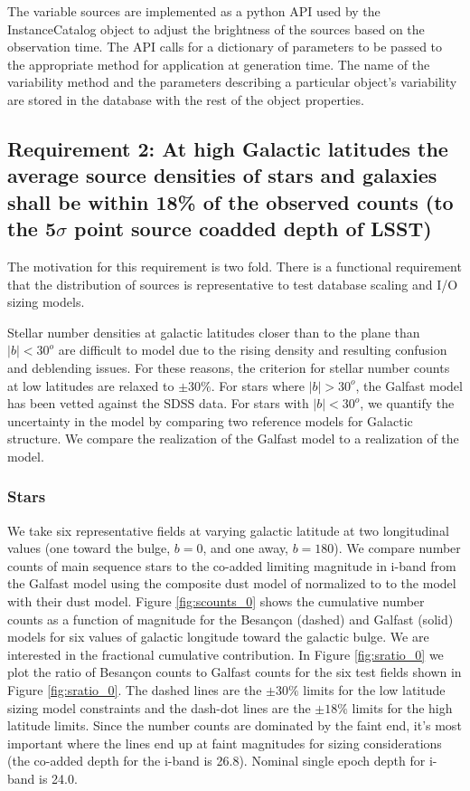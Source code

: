 \documentclass[]{article}
\begin{document}
{The variable sources are implemented as a python API used by the InstanceCatalog object to adjust the brightness of the sources based on the observation time.
The API calls for a dictionary of parameters to be passed to the appropriate method for application at generation time.  The name of the variability method and
the parameters describing a particular object's variability are stored in the database with the rest of the object properties.

\subsection{Requirement 2: At high Galactic latitudes the average source densities of stars and galaxies
shall be within 18\% of the observed counts (to the 5$\sigma$ point source coadded depth of LSST)}
The motivation for this requirement is two fold.  There is a functional requirement that the distribution of sources is representative
to test database scaling and I/O sizing models.  

Stellar number densities at galactic latitudes closer than to the plane than $|b| < 30^o$ are difficult to model due to the rising density and resulting confusion and deblending issues.
For these reasons, the criterion for stellar number counts at low latitudes are relaxed to $\pm 30\%$. 
For stars where $|b| > 30^o$, the Galfast model has been vetted against the SDSS data.  For stars with $|b| < 30^o$, we quantify the uncertainty in the model by comparing two reference models for Galactic structure.
We compare the realization of the Galfast model to a realization of the \citet{besancon} model.

\subsubsection{Stars}
We take six representative fields at varying galactic latitude at two longitudinal values (one toward the bulge, $b=0$, and one away, $b=180$).  
We compare number 
counts of main sequence stars to the co-added limiting magnitude in i-band 
 from the Galfast model using the composite dust model
of \citet{amores05} normalized to \citet{schlegel98} to the \citet{besancon} model with their dust model.  Figure \ref{fig:scounts_0} shows 
the cumulative number counts as a function of magnitude for the Besan\c{c}on (dashed) and Galfast (solid) models 
for six values of galactic longitude toward the galactic bulge.  We are interested in the
fractional cumulative contribution.  In Figure \ref{fig:sratio_0} we plot the ratio of Besan\c{c}on counts to Galfast counts for the six test fields shown in Figure \ref{fig:sratio_0}.
The dashed lines are the $\pm30\%$ limits for the low latitude sizing model constraints and the dash-dot lines are the $\pm18\%$ limits for the high latitude limits.
Since the number counts are dominated by the faint end, it's most important where the lines end up at faint magnitudes for sizing considerations 
(the co-added depth for the i-band is 26.8).  
Nominal single epoch depth for i-band is 24.0.  

}
\end{document}
